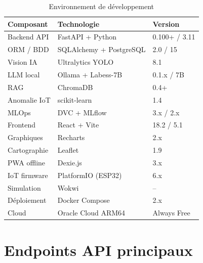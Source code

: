 \documentclass[12pt,a4paper,oneside]{report}
\begin{document}
\begin{table}[H]\centering
\caption{Environnement de développement}
\label{tab:stack}
\begin{tabular}{lll}
\toprule
\textbf{Composant}&\textbf{Technologie}&\textbf{Version}\\
\midrule
Backend API       & FastAPI + Python    & 0.100+ / 3.11\\
ORM / BDD         & SQLAlchemy + PostgreSQL & 2.0 / 15\\
Vision IA         & Ultralytics YOLO    & 8.1\\
LLM local         & Ollama + Labess-7B  & 0.1.x / 7B\\
RAG               & ChromaDB            & 0.4+\\
Anomalie IoT      & scikit-learn        & 1.4\\
MLOps             & DVC + MLflow        & 3.x / 2.x\\
Frontend          & React + Vite        & 18.2 / 5.1\\
Graphiques        & Recharts            & 2.x\\
Cartographie      & Leaflet             & 1.9\\
PWA offline       & Dexie.js            & 3.x\\
IoT firmware      & PlatformIO (ESP32)  & 6.x\\
Simulation        & Wokwi               & --\\
Déploiement       & Docker Compose      & 2.x\\
Cloud             & Oracle Cloud ARM64  & Always Free\\
\bottomrule
\end{tabular}
\end{table}

\section{Endpoints API principaux}
\end{document}
